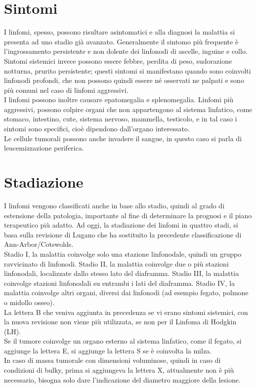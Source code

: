 \section{Sintomi}
I linfomi, spesso, possono risultare asintomatici e alla diagnosi la malattia si presenta ad uno stadio già avanzato.
Generalmente il sintomo più frequente è l’ingrossamento persistente e non dolente dei linfonodi di ascelle, inguine e 
collo\cite{LNHAIL}.\\ 
Sintomi sistemici invece possono essere febbre, perdita di peso, sudorazione notturna, prurito persistente; 
questi sintomi si manifestano quando sono coinvolti linfonodi profondi, che non possono quindi essere né osservati 
ne palpati e sono più comuni nel caso di linfomi aggressivi.\\ 
I linfomi possono inoltre causare epatomegalia e splenomegalia\cite{AMERICANCANCER}. 
Linfomi più aggressivi, possono colpire organi che non appartengono al sistema linfatico, come stomaco, intestino, 
cute, sistema nervoso, mammella, testicolo, e in tal caso i sintomi sono specifici, cioè dipendono 
dall’organo interessato\cite{AMERICANCANCER}.\\ 
Le cellule tumorali possono anche invadere il sangue, in questo caso si parla di leucemizzazione periferica\cite{LNHAIL}.

\section{Stadiazione}
I linfomi vengono classificati anche in base allo stadio, quindi al grado di estensione della patologia, 
importante al fine di determinare la prognosi e il piano terapeutico più adatto. 
Ad oggi, la stadiazione dei linfomi in quattro stadi, si basa sulla revisione di Lugano che ha sostituito 
la precedente classificazione di Ann-Arbor/Cotswolds\cite{AIOM}.\\
Stadio I, la malattia coinvolge solo una stazione linfonodale, quindi un gruppo ravvicinato di linfonodi. 
Stadio II, la malattia coinvolge due o più stazioni linfonodali, localizzate dallo stesso lato del diaframma. 
Stadio III, la malattia coinvolge stazioni linfonodali su entrambi i lati del diaframma. 
Stadio IV, la malattia coinvolge altri organi, diversi dai linfonodi (ad esempio fegato, polmone o midollo osseo)\cite{LLS}.\\
La lettera B che veniva aggiunta in precedenza se vi erano sintomi sistemici, con la nuova revisione non viene 
più utilizzata, se non per il Linfoma di Hodgkin (LH)\cite{AIOM}.\\
Se il tumore coinvolge un organo esterno al sistema linfatico, come il fegato, si aggiunge la lettera E, 
si aggiunge la lettera S se è coinvolta la milza\cite{ISTGENT}.\\
In caso di massa tumorale con dimensioni voluminose, quindi in caso di condizioni di bulky, 
prima si aggiungeva la lettera X, attualmente non è più necessario, 
bisogna solo dare l’indicazione del diametro maggiore della lesione\cite{AIOM}.\\ 

